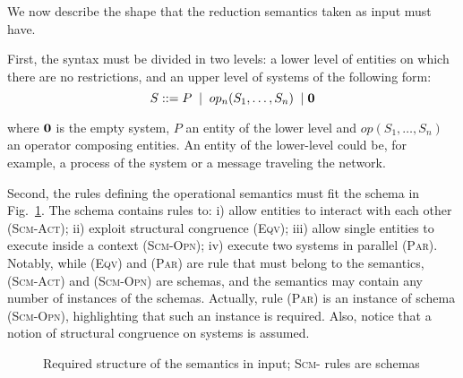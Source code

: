 \documentclass{article}[12pt,a4paper]
\theoremstyle{definition}
\newcommand{\paral}{\;|\;}
\begin{document}
We now describe the shape that the reduction semantics taken as input
must have.

First, the syntax must be divided in two levels: a lower level of entities on which there are no restrictions, and an upper level of systems of the following
form:
\[
  S::=P\;\paral \;\op(S_1,\ldots,S_n)\; \paral \nil
\]

where ${\bf{0}}$ is the empty system, $P$ an entity of the lower level and $op(S_1,\ldots,S_n)$ an operator
composing entities. An entity of the lower-level could be, for example, a process of the system or
a message traveling the network.


Second, the rules defining the operational semantics must fit the schema in Fig.~\ref{fig:forwardrules}.
The schema contains rules to: i) allow entities to interact with each other (\textsc{Scm-Act}); ii)
exploit structural congruence (\textsc{Eqv}); iii) allow single entities to execute inside a context (\textsc{Scm-Opn});
iv) execute two systems in parallel (\textsc{Par}). Notably, while (\textsc{Eqv}) and (\textsc{Par}) are rule that must belong to the semantics, (\textsc{Scm-Act}) and (\textsc{Scm-Opn}) are schemas, and the semantics may contain any number of instances of the schemas. Actually, rule (\textsc{Par}) is an instance of schema (\textsc{Scm-Opn}), highlighting that such an instance is required. Also, notice that a notion of structural congruence on systems is assumed. 

\begin{figure}[t]
  {\footnotesize
    }
  \caption{Required structure of the semantics in input; \textsc{Scm-} rules are schemas}
  \label{fig:forwardrules}
\end{figure}
\end{document}
